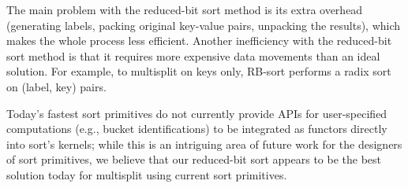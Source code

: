 The main problem with the reduced-bit sort method is its extra overhead (generating labels, packing original key-value pairs, unpacking the results), which makes the whole process less efficient.
Another inefficiency with the reduced-bit sort method is that it requires more expensive data movements than an ideal solution.
For example, to multisplit on keys only, RB-sort performs a radix sort on (label, key) pairs.

Today's fastest sort primitives do not currently provide APIs for user-specified computations (e.g., bucket identifications) to be integrated as functors directly into sort's kernels; while this is an intriguing area of future work for the designers of sort primitives, we believe that our reduced-bit sort appears to be the best solution today for multisplit using current sort primitives.
